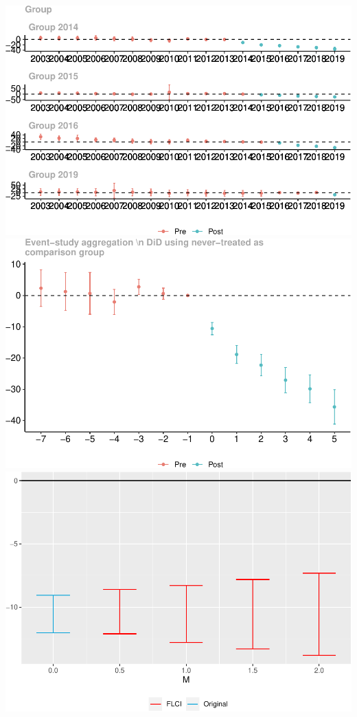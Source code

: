 \documentclass[
  12pt,
]{article}
\begin{document}
\includegraphics{Report_files/figure-latex/Figures-7.pdf}
\includegraphics{Report_files/figure-latex/Figures-8.pdf}
\includegraphics{Report_files/figure-latex/Figures-9.pdf}
\end{document}
